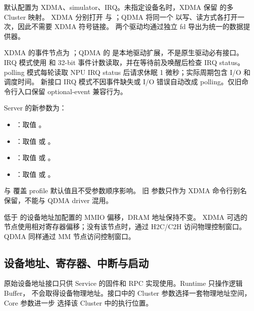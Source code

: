 \documentclass[../dayan_api_reference.tex]{subfiles}
\begin{document}
默认配置为 XDMA、simulator、IRQ。未指定设备名时，XDMA 保留
 的多 Cluster 映射。
XDMA 分别打开  与 ；QDMA 将同一个
 以写、读方式各打开一次，因此不需要 XDMA 符号链接。
两个驱动均通过独立 fd 导出为统一的数据提供器。

XDMA 的事件节点为 ；QDMA 的
 是本地驱动扩展，不是原生驱动必有接口。
IRQ 模式使用  和 32-bit 事件计数读取，并在等待前及唤醒后检查 IRQ status。
polling 模式每轮读取 NPU IRQ status 后请求休眠 1 微秒；实际周期包含 I/O 和调度时间。
新接口 IRQ 模式不因事件缺失或 I/O 错误自动改成 polling。仅旧命令行入口保留
optional-event 兼容行为。

Server 的新参数为：
\begin{itemize}
  \item {}：取值 。
  \item {}：取值  或 。
  \item {}：取值  或 。
  \item {}：取值  或 。
\end{itemize}
 与  覆盖 profile 默认值且不受参数顺序影响。
旧  参数只作为 XDMA 命令行别名保留，不能与 QDMA driver 混用。

低于  的设备地址加配置的 MMIO 偏移，DRAM 地址保持不变。
XDMA 可选的  节点使用相对寄存器偏移；没有该节点时，通过 H2C/C2H
访问物理控制窗口。QDMA 同样通过 MM 节点访问控制窗口。

\subsection{设备地址、寄存器、中断与启动}

原始设备地址接口只供 Service 的固件和 RPC 实现使用。Runtime 只操作逻辑 Buffer，
不会取得设备物理地址。接口中的 Cluster 参数选择一套物理地址空间，Core 参数进一步
选择该 Cluster 中的执行位置。
\end{document}
